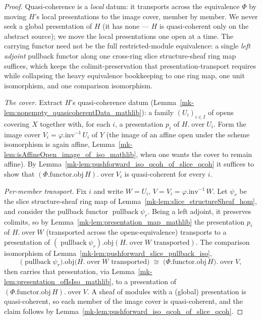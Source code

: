 \begin{proof}
  \leanok
    Quasi-coherence is a \emph{local} datum: it transports across the equivalence \(\Phi\) by moving
  \(H\)'s local presentations to the image cover, member by member. We never seek a global presentation
  of \(H\) (it has none — \(H\) is quasi-coherent only on the abstract source); we move the local
  presentations one open at a time. The carrying functor need not be the full
  restricted-module equivalence: a single \emph{left adjoint} pullback functor along one cross-ring
  slice structure-sheaf ring map suffices, which keeps the colimit-preservation that
  presentation-transport requires while collapsing the heavy equivalence bookkeeping to one ring map,
  one unit isomorphism, and one comparison isomorphism.

  \emph{The cover.} Extract \(H\)'s quasi-coherence datum
  (Lemma~\ref{mk-lem:nonempty_quasicoherentData_mathlib}): a family \((U_i)_{i \in I}\) of opens covering
  \(X\) together with, for each \(i\), a presentation \(p_i\) of \(H.\operatorname{over} U_i\). Form the
  image cover \(V_i = \varphi.\mathrm{inv}^{-1}\,U_i\) of \(Y\) (the image of an affine open under the
  scheme isomorphism is again affine, Lemma~\ref{mk-lem:isAffineOpen_image_of_iso_mathlib}, when one wants
  the cover to remain affine). By Lemma~\ref{mk-lem:pushforward_iso_qcoh_of_slice_qcoh} it suffices to show
  that \((\Phi.\mathrm{functor}.\mathrm{obj}\, H).\operatorname{over} V_i\) is quasi-coherent for every
  \(i\).

  \emph{Per-member transport.} Fix \(i\) and write \(W = U_i\), \(V = V_i =
  \varphi.\mathrm{inv}^{-1}\,W\). Let \(\psi_r\) be the slice structure-sheaf ring map of
  Lemma~\ref{mk-lem:slice_structureSheaf_hom}, and consider the pullback functor
  \(\operatorname{pullback}\psi_r\). Being a left adjoint, it preserves colimits, so by
  Lemma~\ref{mk-lem:presentation_map_mathlib} the presentation \(p_i\) of \(H.\operatorname{over} W\)
  (transported across the opens-equivalence) transports to a presentation of
  \((\operatorname{pullback}\psi_r).\mathrm{obj}(H.\operatorname{over} W \text{ transported})\). The
  comparison isomorphism of Lemma~\ref{mk-lem:pushforward_slice_pullback_iso},
  \[
    \bigl(\operatorname{pullback}\psi_r\bigr).\mathrm{obj}\bigl(H.\operatorname{over} W
      \text{ transported}\bigr)
      \;\cong\;
    \bigl(\Phi.\mathrm{functor}.\mathrm{obj}\, H\bigr).\operatorname{over} V,
  \]
  then carries that presentation, via Lemma~\ref{mk-lem:presentation_ofIsIso_mathlib}, to a presentation of
  \((\Phi.\mathrm{functor}.\mathrm{obj}\, H).\operatorname{over} V\). A sheaf of modules with a (global)
  presentation is quasi-coherent, so each member of the image cover is quasi-coherent, and the claim
  follows by Lemma~\ref{mk-lem:pushforward_iso_qcoh_of_slice_qcoh}.


\end{proof}
